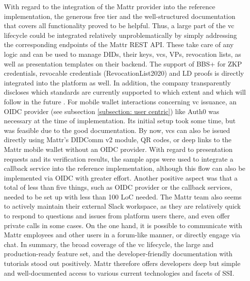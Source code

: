         With regard to the integration of the Mattr provider into the reference implementation, the generous free tier and the well-structured documentation that covers all functionality proved to be helpful. Thus, a large part of the \ac{vc} lifecycle could be integrated relatively unproblematically by simply addressing the corresponding endpoints of the Mattr REST API. These take care of any logic and can be used to manage \acp{DID}, their keys, \acp{vc}, \acp{VP}, revocation lists, as well as presentation templates on their backend. The support of BBS+ for \ac{ZKP} credentials, revocable credentials (RevocationList2020) and LD proofs is directly integrated into the platform as well. In addition, the company transparently discloses which standards are currently supported to which extent and which will follow in the future \cite{mattr_supported_2021, mattr_upcoming_2021}. For mobile wallet interactions concerning \ac{vc} issuance, an \ac{OIDC} provider (see subsection \ref{subsection: user centric}) like Auth0 was necessary at the time of implementation. Its initial setup took some time, but was feasible due to the good documentation. By now, \acp{vc} can also be issued directly using Mattr's DIDComm v2 module, QR codes, or deep links to the Mattr mobile wallet without an \ac{OIDC} provider. With regard to presentation requests and its verification results, the sample apps were used to integrate a callback service into the reference implementation, although this flow can also be implemented via \ac{OIDC} with greater effort. Another positive aspect was that a total of less than five things, such as OIDC provider or the callback services, needed to be set up with less than 100 LoC needed. The Mattr team also seems to actively maintain their external Slack workspace, as they are relatively quick to respond to questions and issues from platform users there, and even offer private calls in some cases. On the one hand, it is possible to communicate with Mattr employees and other users in a forum-like manner, or directly engage via chat. In summary, the broad coverage of the \ac{vc} lifecycle, the large and production-ready feature set, and the developer-friendly documentation with tutorials stood out positively. Mattr therefore offers developers deep but simple and well-documented access to various current technologies and facets of \ac{SSI}.
    
